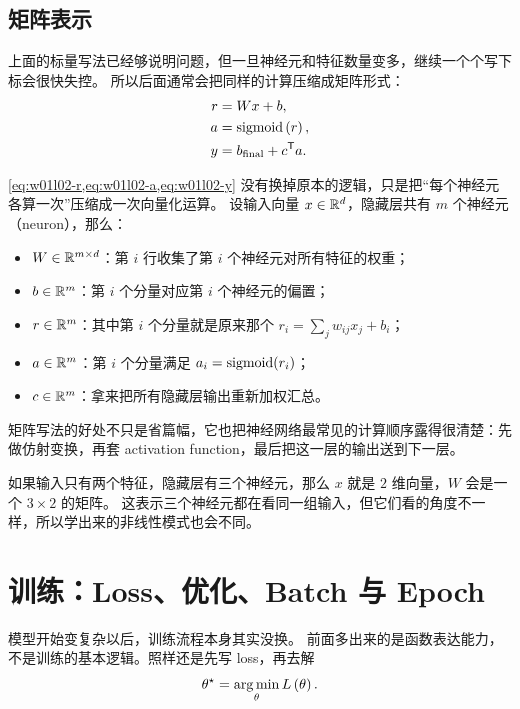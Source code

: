\documentclass[main.tex]{subfiles}
\begin{document}
\subsection{矩阵表示}
\label{sec:w01l02-matrix-form}

上面的标量写法已经够说明问题，但一旦神经元和特征数量变多，继续一个个写下标会很快失控。
所以后面通常会把同样的计算压缩成矩阵形式：
\begin{align}
  r &= Wx + b, \label{eq:w01l02-r} \\
  a &= \operatorname{sigmoid}\left( r \right), \label{eq:w01l02-a} \\
  y &= b_{\mathrm{final}} + c^{\mathsf{T}} a. \label{eq:w01l02-y}
\end{align}

\cref{eq:w01l02-r,eq:w01l02-a,eq:w01l02-y} 没有换掉原本的逻辑，只是把“每个神经元各算一次”压缩成一次向量化运算。
设输入向量 $x \in \mathbb{R}^d$，隐藏层共有 $m$ 个神经元（neuron），那么：
\begin{itemize}
  \item $W \in \mathbb{R}^{m \times d}$：第 $i$ 行收集了第 $i$ 个神经元对所有特征的权重；
  \item $b \in \mathbb{R}^m$：第 $i$ 个分量对应第 $i$ 个神经元的偏置；
  \item $r \in \mathbb{R}^m$：其中第 $i$ 个分量就是原来那个 $r_i=\sum_j w_{ij}x_j+b_i$；
  \item $a \in \mathbb{R}^m$：第 $i$ 个分量满足 $a_i=\operatorname{sigmoid}(r_i)$；
  \item $c \in \mathbb{R}^m$：拿来把所有隐藏层输出重新加权汇总。
\end{itemize}

矩阵写法的好处不只是省篇幅，它也把神经网络最常见的计算顺序露得很清楚：先做仿射变换，再套 activation function，最后把这一层的输出送到下一层。

\begin{examplebox}
如果输入只有两个特征，隐藏层有三个神经元，那么 $x$ 就是 $2$ 维向量，$W$ 会是一个 $3 \times 2$ 的矩阵。
这表示三个神经元都在看同一组输入，但它们看的角度不一样，所以学出来的非线性模式也会不同。
\end{examplebox}

\section{训练：Loss、优化、Batch 与 Epoch}
\label{sec:w01l02-training}

模型开始变复杂以后，训练流程本身其实没换。
前面多出来的是函数表达能力，不是训练的基本逻辑。照样还是先写 loss，再去解
\begin{equation}
  \theta^\star = \operatorname*{arg\,min}_\theta L\left( \theta \right).
  \label{eq:w01l02-opt}
\end{equation}
\end{document}

